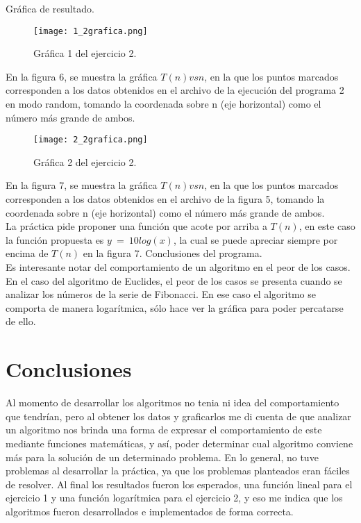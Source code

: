 \documentclass[12pt]{report}
\begin{document}
	Gráfica de resultado.\\
	\begin{figure}[H]
		\texttt{[image: 1\_2grafica.png]}
		\centering
		\caption{Gráfica 1 del ejercicio 2.}
		\centering
	\end{figure}
	En la figura 6, se muestra la gráfica $T(n) vs n$, en la que los puntos marcados corresponden a los datos obtenidos en el archivo de la ejecución del programa 2 en modo random, tomando la coordenada sobre n (eje horizontal) como el número más grande de ambos.\\
	
	\begin{figure}[H]
		\texttt{[image: 2\_2grafica.png]}
		\centering
		\caption{Gráfica 2 del ejercicio 2.}
		\centering
	\end{figure}
	En la figura 7, se muestra la gráfica $T(n) vs n$, en la que los puntos marcados corresponden a los datos obtenidos en el archivo de la figura 5, tomando la coordenada sobre n (eje horizontal) como el número más grande de ambos.\\
	La práctica pide proponer una función que acote por arriba a $T(n)$, en este caso la función propuesta es $y \ = \ 10log(x)$, la cual se puede apreciar siempre por encima de $T(n)$ en la figura 7.\newpage
		Conclusiones del programa.\\
	Es interesante notar del comportamiento de un algoritmo en el peor de los casos. En el caso del algoritmo de Euclides, el peor de los casos se presenta cuando se analizar los números de la serie de Fibonacci. En ese caso el algoritmo se comporta de manera logarítmica, sólo hace ver la gráfica para poder percatarse de ello. 
	
	\section{Conclusiones}
	Al momento de desarrollar los algoritmos no tenia ni idea del comportamiento que tendrían, pero al obtener los datos y graficarlos me di cuenta de que analizar un algoritmo nos brinda una forma de expresar el comportamiento de este mediante funciones matemáticas, y así, poder determinar cual algoritmo conviene más para la solución de un determinado problema. En lo general, no tuve problemas al desarrollar la práctica, ya que los problemas planteados eran fáciles de resolver. Al final los resultados fueron los esperados, una función lineal para el ejercicio 1 y una función logarítmica para el ejercicio 2, y eso me indica que los algoritmos fueron desarrollados e implementados de forma correcta.\\
		
\end{document}
